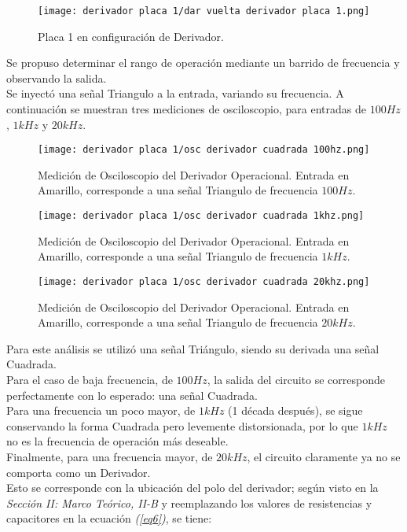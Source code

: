 \documentclass[letterpaper, 10 pt, conference]{ieeeconf}  %
\begin{document}
\begin{figure}[H]
  \centering
  \texttt{[image: derivador placa 1/dar vuelta derivador placa 1.png]}
  \caption{Placa 1 en configuración de Derivador.}
  \label{fig:derivadorplaca1}
\end{figure}

Se propuso determinar el rango de operación mediante un barrido de frecuencia y observando la salida. \\
Se inyectó una señal Triangulo a la entrada, variando su frecuencia.
A continuación se muestran tres mediciones de osciloscopio, para entradas de $100Hz$, $1kHz$ y $20kHz$.

\begin{figure}[H]
  \centering
  \texttt{[image: derivador placa 1/osc derivador cuadrada 100hz.png]}
  \caption{Medición de Osciloscopio del Derivador Operacional. Entrada en Amarillo, corresponde a una señal Triangulo de frecuencia $100Hz$.}
  \label{fig:derivadorplaca1}
\end{figure}

\begin{figure}[H]
  \centering
  \texttt{[image: derivador placa 1/osc derivador cuadrada 1khz.png]}
  \caption{Medición de Osciloscopio del Derivador Operacional. Entrada en Amarillo, corresponde a una señal Triangulo de frecuencia $1kHz$.}
  \label{fig:derivadorplaca1}
\end{figure}

\begin{figure}[H]
  \centering
  \texttt{[image: derivador placa 1/osc derivador cuadrada 20khz.png]}
  \caption{Medición de Osciloscopio del Derivador Operacional. Entrada en Amarillo, corresponde a una señal Triangulo de frecuencia $20kHz$.}
  \label{fig:derivadorplaca1}
\end{figure}

Para este análisis se utilizó una señal Triángulo, siendo su derivada una señal Cuadrada.\\
Para el caso de baja frecuencia, de $100Hz$, la salida del circuito se corresponde perfectamente con lo esperado: una señal Cuadrada.\\
Para una frecuencia un poco mayor, de $1kHz$ (1 década después), se sigue conservando la forma Cuadrada pero levemente distorsionada, por lo que $1kHz$ no es la frecuencia de operación más deseable.\\
Finalmente, para una frecuencia mayor, de $20kHz$, el circuito claramente ya no se comporta como un Derivador.\\
Esto se corresponde con la ubicación del polo del derivador; según visto en la \textit{Sección II: Marco Teórico, II-B} y reemplazando los valores de resistencias y capacitores en la ecuación \textit{(\ref{eq6})}, se tiene:
\end{document}
